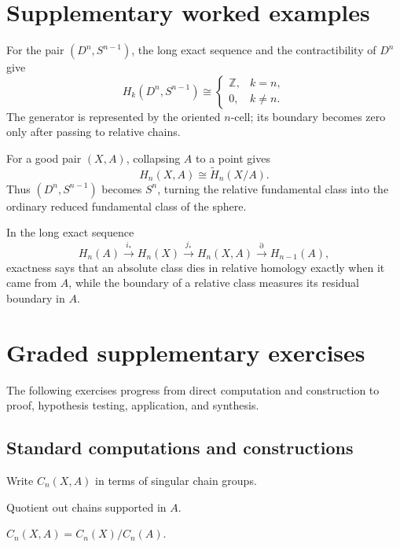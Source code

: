 \section{Supplementary worked examples}
\label{sec:viii19-pedagogy}

\begin{example}\label{ex:viii19-ped-01}
For the pair $(D^n,S^{n-1})$, the long exact sequence and the contractibility of $D^n$ give
\[
H_k(D^n,S^{n-1})\cong
\begin{cases}
\mathbb Z,&k=n,\\
0,&k\ne n.
\end{cases}
\]
The generator is represented by the oriented $n$-cell; its boundary becomes zero only after passing to relative chains.
\end{example}

\begin{example}\label{ex:viii19-ped-02}
For a good pair $(X,A)$, collapsing $A$ to a point gives
\[
H_n(X,A)\cong \widetilde H_n(X/A).
\]
Thus $(D^n,S^{n-1})$ becomes $S^n$, turning the relative fundamental class into the ordinary reduced fundamental class of the sphere.
\end{example}

\begin{example}\label{ex:viii19-ped-03}
In the long exact sequence
\[
H_n(A)\xrightarrow{i_*}H_n(X)\xrightarrow{j_*}H_n(X,A)\xrightarrow{\partial}H_{n-1}(A),
\]
exactness says that an absolute class dies in relative homology exactly when it came from $A$, while the boundary of a relative class measures its residual boundary in $A$.
\end{example}

\section{Graded supplementary exercises}
The following exercises progress from direct computation and construction to proof, hypothesis testing, application, and synthesis.

\subsection*{Standard computations and constructions}

\begin{exercise}\label{exr:viii19-ped-01}
Write $C_n(X,A)$ in terms of singular chain groups.
\end{exercise}
\begin{hint}
Quotient out chains supported in $A$.
\end{hint}
\begin{solution}
$C_n(X,A)=C_n(X)/C_n(A)$.
\end{solution}

